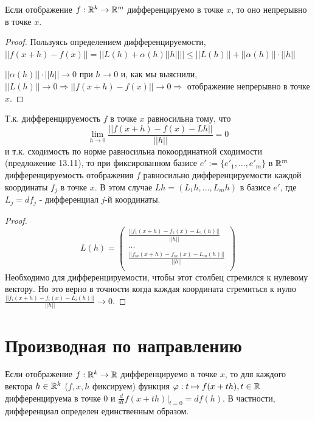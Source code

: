     \begin{corollary}
    	Если отображение $f : \mathbb R^k \rightarrow \mathbb R^m$ дифференцируемо в точке $x$, то оно непрерывно в точке $x$.
    \end{corollary}
    
    \begin{proof}
    	Пользуясь определением дифференцируемости, $||f(x + h) - f(x)|| = ||L(h) + \alpha(h)||h|||| \leqslant ||L(h)|| + ||\alpha(h)|| \cdot ||h||$
    	
    	$||\alpha(h)|| \cdot ||h|| \to 0$ при $h \to 0$ и, как мы выяснили, $||L(h)|| \to 0 \Rightarrow ||f(x + h) - f(x)|| \to 0 \Rightarrow$ отображение непрерывно в точке $x$.
    \end{proof}
    
    \begin{mention}
    	Т.к. дифференцируемость $f$ в точке $x$ равносильна тому, что
    	\[ \lim_{h \to 0} \frac{||f(x + h) - f(x) - Lh||}{||h||} = 0 \]
    	и т.к. сходимость по норме равносильна покоординатной сходимости (предложение 13.11), то при фиксированном базисе $e' := \{e'_1, ..., e'_m\}$	в $\mathbb R^m$ дифференцируемость отображения $f$ равносильно дифференцируемости каждой координаты $f_j$ в точке $x$. В этом случае $Lh = (L_1 h, ..., L_m h)$ в базисе $e'$, где $L_j = df_j$ - дифференциал $j$-й координаты.
    \end{mention}
    
    \begin{proof}
    	 \[ L(h) = \begin{pmatrix}
    	 \frac{||f_1(x + h) - f_1(x) - L_1(h)||}{||h||} \\
    	 ... \\
    	 \frac{||f_m(x + h) - f_m(x) - L_m(h)||}{||h||} \\
    	 \end{pmatrix} \]
    	 Необходимо для дифференцируемости, чтобы этот столбец стремился к нулевому вектору. Но это верно в точности когда каждая координата стремиться к нулю
    	 $\frac{||f_i(x + h) - f_i(x) - L_i(h)||}{||h||} \to 0$.    	 
    \end{proof}
    
    \section{Производная по направлению}
    
    \begin{lemma}
    	Если отображение $f : \mathbb R^k \rightarrow \mathbb R$ дифференцируемо в точке $x$, то для каждого вектора $h \in \mathbb R^k$ ($f, x, h$ фиксируем) функция $\varphi: t \mapsto f(x + th), t \in \mathbb R$ дифференцируема в точке 0 и $\displaystyle \frac{d}{dt} f(x + th) \bigg|_{t = 0} = df(h)$. В частности, дифференциал определен единственным образом.	
    \end{lemma}
    
